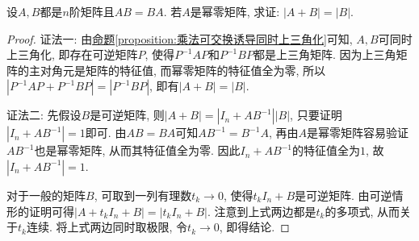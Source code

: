 \documentclass[../../main.tex]{subfiles}
\begin{document}
\begin{example}
设\(A,B\)都是\(n\)阶矩阵且\(AB = BA\). 若\(A\)是幂零矩阵, 求证: \(|A + B| = |B|\).
\end{example}
\begin{proof}
{\color{blue}证法一:} 由\hyperref[proposition:乘法可交换诱导同时上三角化]{命题\ref{proposition:乘法可交换诱导同时上三角化}}可知, \(A,B\)可同时上三角化, 即存在可逆矩阵\(P\), 使得\(P^{-1}AP\)和\(P^{-1}BP\)都是上三角矩阵. 因为上三角矩阵的主对角元是矩阵的特征值, 而幂零矩阵的特征值全为零, 所以\(|P^{-1}AP + P^{-1}BP| = |P^{-1}BP|\), 即有\(|A + B| = |B|\).
    
{\color{blue}证法二:} 先假设\(B\)是可逆矩阵, 则\(|A + B| = |I_{n}+AB^{-1}||B|\), 只要证明\(|I_{n}+AB^{-1}| = 1\)即可. 由\(AB = BA\)可知\(AB^{-1}=B^{-1}A\), 再由\(A\)是幂零矩阵容易验证\(AB^{-1}\)也是幂零矩阵, 从而其特征值全为零. 因此\(I_{n}+AB^{-1}\)的特征值全为\(1\), 故\(|I_{n}+AB^{-1}| = 1\). 
    
对于一般的矩阵\(B\), 可取到一列有理数\(t_{k}\to 0\), 使得\(t_{k}I_{n}+B\)是可逆矩阵. 由可逆情形的证明可得\(|A + t_{k}I_{n}+B| = |t_{k}I_{n}+B|\). 注意到上式两边都是\(t_{k}\)的多项式, 从而关于\(t_{k}\)连续. 将上式两边同时取极限, 令\(t_{k}\to 0\), 即得结论.

\end{proof}
\end{document}
